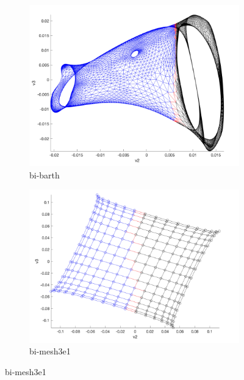 \documentclass[unicode,11pt,a4paper,oneside,numbers=endperiod,openany]{scrartcl}
\begin{document}
\begin{figure}[htbp]
    \centering
    
    \begin{subfigure}[b]{0.4\textwidth}
        \includegraphics[width=\textwidth]{images/bi-barth.png}
        \caption{bi-barth}
    \end{subfigure}
    \hfill
    \begin{subfigure}[b]{0.4\textwidth}
        \includegraphics[width=\textwidth]{images/bi-mesh3e1.png}
        \caption{bi-mesh3e1} 
    \end{subfigure}
    
\end{figure}
\end{document}
